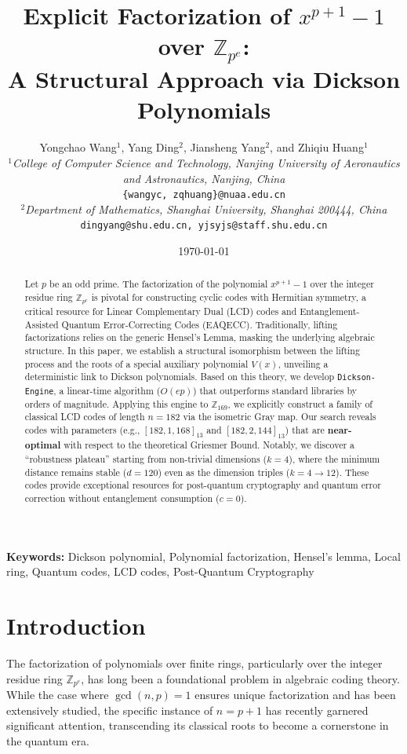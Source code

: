 \documentclass[12pt]{article}
\title{\textbf{Explicit Factorization of $x^{p+1}-1$ over $\mathbb{Z}_{p^e}$: \\ A Structural Approach via Dickson Polynomials}}
\author{
    Yongchao Wang$^{1}$, Yang Ding$^{2}$, Jiansheng Yang$^{2}$, and Zhiqiu Huang$^{1}$ \\[0.5em]
    $^{1}$\textit{College of Computer Science and Technology, Nanjing University of Aeronautics and Astronautics, Nanjing, China} \\
    \texttt{\{wangyc, zqhuang\}@nuaa.edu.cn} \\[0.5em]
    $^{2}$\textit{Department of Mathematics, Shanghai University, Shanghai 200444, China} \\
    \texttt{dingyang@shu.edu.cn, yjsyjs@staff.shu.edu.cn}
}
\date{\today}
\theoremstyle{plain}
\numberwithin{equation}{section}
\begin{document}
\maketitle

\begin{abstract}
Let $p$ be an odd prime. The factorization of the polynomial $x^{p+1}-1$ over the integer residue ring $\mathbb{Z}_{p^e}$ is pivotal for constructing cyclic codes with Hermitian symmetry, a critical resource for Linear Complementary Dual (LCD) codes and Entanglement-Assisted Quantum Error-Correcting Codes (EAQECC). 
Traditionally, lifting factorizations relies on the generic Hensel's Lemma, masking the underlying algebraic structure. 
In this paper, we establish a structural isomorphism between the lifting process and the roots of a special auxiliary polynomial $V(x)$, unveiling a deterministic link to Dickson polynomials. 
Based on this theory, we develop \texttt{Dickson-Engine}, a linear-time algorithm ($O(ep)$) that outperforms standard libraries by orders of magnitude.
Applying this engine to $\mathbb{Z}_{169}$, we explicitly construct a family of classical LCD codes of length $n=182$ via the isometric Gray map. 
Our search reveals codes with parameters (e.g., $[182, 1, 168]_{13}$ and $[182, 2, 144]_{13}$) that are \textbf{near-optimal} with respect to the theoretical Griesmer Bound. 
Notably, we discover a ``robustness plateau'' starting from non-trivial dimensions ($k=4$), where the minimum distance remains stable ($d=120$) even as the dimension triples ($k=4 \rightarrow 12$). These codes provide exceptional resources for post-quantum cryptography and quantum error correction without entanglement consumption ($c=0$).
\end{abstract}

\bigskip

\noindent \textbf{Keywords:} Dickson polynomial, Polynomial factorization, Hensel's lemma, Local ring, Quantum codes, LCD codes, Post-Quantum Cryptography
\section{Introduction}

The factorization of polynomials over finite rings, particularly over the integer residue ring $\mathbb{Z}_{p^e}$, has long been a foundational problem in algebraic coding theory. While the case where $\gcd(n, p) = 1$ ensures unique factorization and has been extensively studied, the specific instance of $n = p+1$ has recently garnered significant attention, transcending its classical roots to become a cornerstone in the quantum era.
\end{document}
